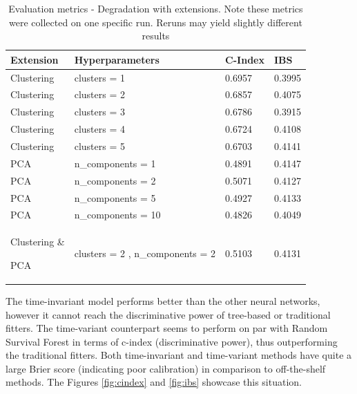 \documentclass[%
 twocolumn,
 reprint,
 amsmath,amssymb,
 aps,nofootinbib
]{revtex4-2}
\begin{document}
\begin{table}
  \centering
  \begin{tabular}{|p{2cm}|p{3cm}|p{1.4cm}|p{1cm}|}
     \hline
    \textbf{Extension} & \textbf{Hyperparameters} & \textbf{C-Index} & \textbf{IBS} \\
    \hline
    \raggedright Clustering & \raggedright clusters = 1 & 0.6957 & 0.3995 \\
    \hline
    \raggedright Clustering & \raggedright clusters = 2 & 0.6857 & 0.4075 \\
    \hline
    \raggedright Clustering & \raggedright clusters = 3 & 0.6786 & 0.3915 \\
    \hline
    \raggedright Clustering & \raggedright clusters = 4 & 0.6724 & 0.4108 \\
    \hline
    \raggedright Clustering & \raggedright clusters = 5 & 0.6703 & 0.4141 \\
    \hline
    \raggedright PCA & \raggedright n\_components = 1 & 0.4891 & 0.4147\\
    \hline
    \raggedright PCA & \raggedright n\_components = 2 & 0.5071 & 0.4127\\
    \hline
    \raggedright PCA & \raggedright n\_components = 5 & 0.4927 &  0.4133\\
    \hline
    \raggedright PCA & \raggedright n\_components = 10 & 0.4826 & 0.4049\\
    \hline
    \raggedright Clustering \& \raggedright PCA & clusters = 2 , n\_components = 2& 0.5103 & 0.4131\\
    \hline
  \end{tabular}
  \caption[Evaluation Metrics]{Evaluation metrics - Degradation with extensions. Note these metrics were collected on one specific run. Reruns may yield slightly different results}
  \label{tab:eval_degrad}
\end{table}


The time-invariant model performs better than the other neural networks, however it cannot reach the discriminative power of tree-based or traditional fitters. The time-variant counterpart seems to perform on par with Random Survival Forest in terms of c-index (discriminative power), thus outperforming the traditional fitters. Both time-invariant and time-variant methods have quite a large Brier score (indicating poor calibration) in comparison to off-the-shelf methods. The Figures \ref{fig:cindex} and \ref{fig:ibs} showcase this situation.\\
\end{document}
